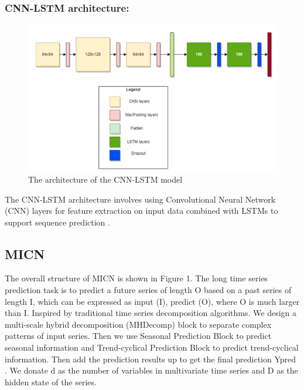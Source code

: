 \documentclass[conference]{IEEEtran}
\begin{document}
\subsubsection{CNN-LSTM architecture:}
\begin{figure}[H]
    \centering
    \begin{minipage}{0.8\linewidth}
    \centering
        \includegraphics[width=\linewidth]{images/CNNLSTM_Architechture.png}
    \caption{The architecture of the CNN-LSTM model}
    \label{fig10}
    \end{minipage}
\end{figure}

The CNN-LSTM architecture involves using Convolutional Neural Network (CNN) layers for feature extraction on input data combined with LSTMs to support sequence prediction \cite{PredictStockCNNLSTM}.


\subsection{MICN}
The overall structure of MICN is shown in Figure 1. The long time series prediction task is to predict a future series of length O based on a past series of length I, which can be expressed as input (I), predict (O), where O is much larger than I. Inspired by traditional time series decomposition algorithms. We design a multi-scale hybrid decomposition (MHDecomp) block to separate complex patterns of input series. Then we use Seasonal Prediction Block to predict seasonal information and Trend-cyclical Prediction Block to predict trend-cyclical information. Then add the prediction results up to get the final prediction Ypred . We donate d as the number of variables in multivariate time series and D as the hidden state of the series. \cite{MICN}
\end{document}
